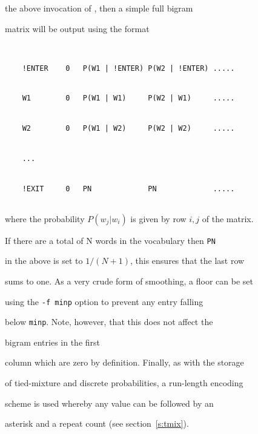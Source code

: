 the above invocation of , then a simple full bigram


matrix will be output using the format


\begin{verbatim}


    !ENTER    0   P(W1 | !ENTER) P(W2 | !ENTER) .....


    W1        0   P(W1 | W1)     P(W2 | W1)     .....


    W2        0   P(W1 | W2)     P(W2 | W2)     .....


    ...


    !EXIT     0   PN             PN             .....


\end{verbatim} 


where the probability $P(w_j|w_i)$ is given by row $i,j$ of the matrix.


If there are a total of N words in the vocabulary then \texttt{PN}


in the above is set to $1/(N+1)$, this ensures that the last row


sums to one.  As a very crude form of smoothing, a floor can be set


using the \texttt{-f minp} option to prevent any entry falling


below \texttt{minp}.  Note, however, that this does not affect the 


bigram entries in the first


column which are zero by definition.  Finally, as with the storage


of tied-mixture and discrete probabilities, a run-length encoding


scheme is used whereby any value can be followed by an 


asterisk and a repeat count (see section~\ref{s:tmix}).















